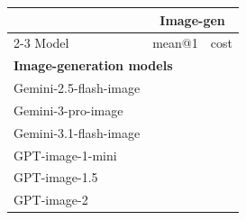 \begin{tabular}{lrr}
\toprule
 & \multicolumn{2}{c}{\textbf{Image-gen}} \\
\cmidrule(lr){2-3}
Model & mean@1 & cost \\
\midrule
\multicolumn{3}{l}{\textbf{Image-generation models}} \\
Gemini-2.5-flash-image & \cellcolor{green!22!red!25!white}{$22.6_{ \pm 4.6}$} & \cellcolor{green!72!red!25!white}{4.14} \\
Gemini-3-pro-image & \cellcolor{green!85!red!25!white}{$54.8_{ \pm 5.5}$} & \cellcolor{green!15!red!25!white}{19.23} \\
Gemini-3.1-flash-image & \cellcolor{green!83!red!25!white}{$53.6_{ \pm 5.5}$} & \cellcolor{green!52!red!25!white}{9.56} \\
GPT-image-1-mini & \cellcolor{green!15!red!25!white}{$19_{ \pm 4.3}$} & \cellcolor{green!85!red!25!white}{0.85} \\
GPT-image-1.5 & \cellcolor{green!57!red!25!white}{$40.5_{ \pm 5.4}$} & \cellcolor{green!71!red!25!white}{4.59} \\
GPT-image-2 & \cellcolor{green!78!red!25!white}{$51.2_{ \pm 5.5}$} & \cellcolor{green!68!red!25!white}{5.26} \\
\bottomrule
\end{tabular}
